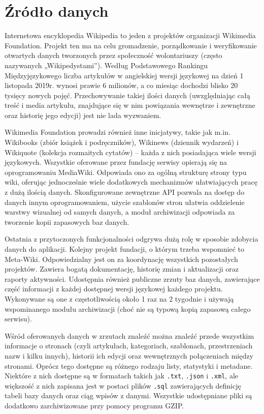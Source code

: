 \section{Źródło danych}
Internetowa encyklopedia Wikipedia to jeden z projektów organizacji Wikimedia Foundation. Projekt ten ma na celu gromadzenie, porządkowanie i weryfikowanie otwartych danych tworzonych przez społeczność wolontariuszy (często nazywanych „Wikipedystami”). Według Podstawowego Rankingu Międzyjęzykowego \cite{Wikipedia:PodstawowyRanking} liczba artykułów w angielskiej wersji językowej na dzień 1 listopada 2019r. wynosi prawie 6 milionów, a co miesiąc dochodzi blisko 20 tysięcy nowych pojęć. Przechowywanie takiej ilości danych (uwzględniając całą treść i media artykułu, znajdujące się w nim powiązania wewnętrze i zewnętrzne oraz historię jego edycji) jest nie lada wyzwaniem.

Wikimedia Foundation prowadzi również inne inicjatywy, takie jak m.in. Wikibooks (zbiór książek i podręczników), Wikinews (dziennik wydarzeń) i Wikiquote (kolekcja rozmaitych cytatów) – każda z nich posiadająca wiele wersji językowych. Wszystkie oferowane przez fundację serwisy opierają się na oprogramowaniu MediaWiki. Odpowiada ono za ogólną strukturę strony typu wiki, oferując jednocześnie wiele dodatkowych mechanizmów ułatwiających pracę z dużą ilością danych. Skonfigurowane zewnętrzne API pozwala na dostęp do danych innym oprogramowaniem, użycie szablonów stron ułatwia oddzielenie warstwy wizualnej od samych danych, a moduł archiwizacji odpowiada za tworzenie kopii zapasowych baz danych.

Ostatnia z przytoczonych funkcjonalności odgrywa dużą rolę w sposobie zdobycia danych do aplikacji. Kolejny projekt fundacji, o którym trzeba wspomnieć to Meta-Wiki. Odpowiedzialny jest on za koordynację wszystkich pozostałych projektów. Zawiera bogatą dokumentację, historię zmian i aktualizacji oraz raporty aktywności. Udostępnia również publiczne zrzuty baz danych, zawierające część informacji z każdej dostępnej wersji językowej każdego projektu. Wykonywane są one z częstotliwością około 1 raz na 2 tygodnie i używają wspominanego modułu archiwizacji (choć nie są typową kopią zapasową całego serwisu).

Wśród oferowanych danych w zrzutach znaleźć można znaleźć przede wszystkim informacje o stronach (czyli artykułach, kategoriach, szablonach, przestrzeniach nazw i kilku innych), historii ich edycji oraz wewnętrznych połączeniach między stronami. Oprócz tego dostępne są różnego rodzaju listy, statystyki i metadane. Niektóre z nich dostępne są w formatach takich jak \lstinline!.txt!, \lstinline!.json! i \lstinline!.xml!, ale większość z nich zapisana jest w postaci plików \lstinline!.sql! zawierających definicję tabeli bazy danych oraz ciąg wpisów z danymi. Wszystkie udostępniane pliki są dodatkowo zarchiwizowane przy pomocy programu GZIP.